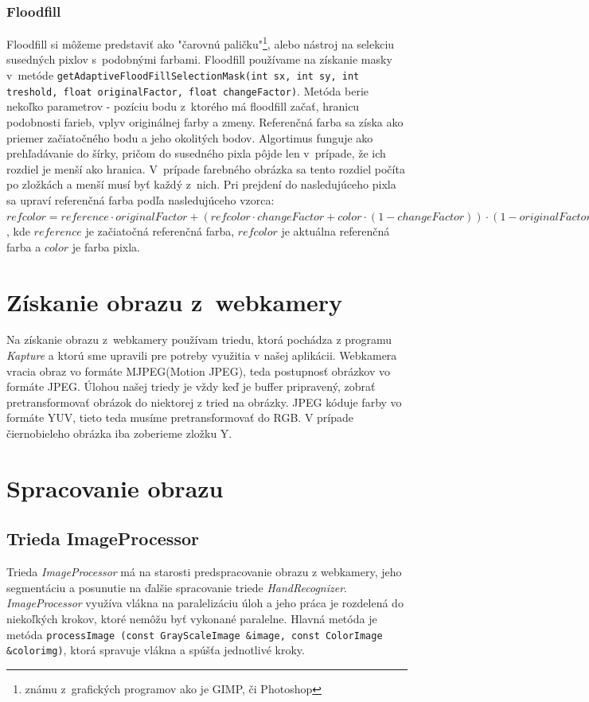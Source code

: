 \subsubsection{Floodfill}
Floodfill si môžeme predstaviť ako "čarovnú paličku"\footnote{známu z~grafických programov ako je GIMP, či Photoshop}, alebo nástroj na selekciu susedných pixlov s~podobnými farbami. Floodfill používame na získanie masky v~metóde {\tt getAdaptiveFloodFillSelectionMask(int sx, int sy, int treshold, float originalFactor, float changeFactor)}. Metóda berie nekoľko parametrov - pozíciu bodu z~ktorého má floodfill začať, hranicu podobnosti farieb, vplyv originálnej farby a zmeny. Referenčná farba sa získa ako priemer začiatočného bodu a jeho okolitých bodov. Algortimus funguje ako prehľadávanie do šírky, pričom do susedného pixla pôjde len v~prípade, že ich rozdiel je menší ako hranica. V~prípade farebného obrázka sa tento rozdiel počíta po zložkách a menší musí byť každý z~nich. Pri prejdení do nasledujúceho pixla sa upraví referenčná farba podľa nasledujúceho vzorca: $refcolor = reference \cdot originalFactor + (refcolor\cdot changeFactor+color \cdot (1-changeFactor)) \cdot (1-originalFactor)$, kde $reference$ je začiatočná referenčná farba, $refcolor$ je aktuálna referenčná farba a $color$ je farba pixla.

\section{Získanie obrazu z~webkamery}
Na získanie obrazu z~webkamery používam triedu, ktorá pochádza z programu \textit{Kapture} \cite{kapture} a ktorú sme upravili pre potreby využitia v našej aplikácii. Webkamera vracia obraz vo formáte MJPEG(Motion JPEG), teda postupnosť obrázkov vo formáte JPEG. Úlohou našej triedy je vždy keď je buffer pripravený, zobrať pretransformovať obrázok do niektorej z tried na obrázky. JPEG kóduje farby vo formáte YUV, tieto teda musíme pretransformovať do RGB. V prípade čiernobieleho obrázka iba zoberieme zložku Y.

\section{Spracovanie obrazu}
\subsection{Trieda ImageProcessor}
Trieda \textit{ImageProcessor} má na starosti predspracovanie obrazu z webkamery, jeho segmentáciu a posunutie na ďalšie spracovanie triede \textit{HandRecognizer}. \textit{ImageProcessor} využíva vlákna na paralelizáciu úloh a jeho práca je rozdelená do niekoľkých krokov, ktoré nemôžu byť vykonané paralelne. Hlavná metóda je metóda {\tt processImage (const GrayScaleImage \&image, const ColorImage \&colorimg)}, ktorá spravuje vlákna a spúšťa jednotlivé kroky. 

